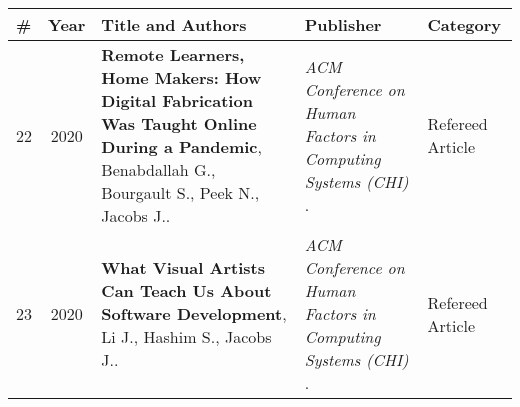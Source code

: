 
\begin{longtable}{lcp{7.75cm}>{\raggedright}p{5.25cm}p{1.75cm}}
\# & Year & Title and Authors & Publisher & Category\\
\hline 
\endhead 
    22 & 2020 & {\bf Remote Learners, Home Makers: How Digital Fabrication Was Taught Online During a Pandemic}, Benabdallah G., Bourgault S., Peek N., Jacobs J..  & \emph{ ACM Conference on Human Factors in Computing Systems (CHI) } .   & Refereed Article\\
    23 & 2020 & {\bf What Visual Artists Can Teach Us About Software Development}, Li J., Hashim S., Jacobs J..  & \emph{ ACM Conference on Human Factors in Computing Systems (CHI) } .   & Refereed Article\\
\end{longtable}
